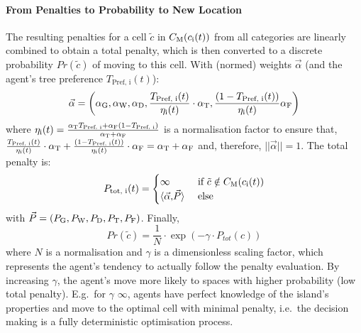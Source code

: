 \paragraph{From Penalties to Probability to New Location}
The resulting penalties for a cell $\tilde{c}$ in $C_{\rm M}(c_{\rm i}(t))$ from all categories are linearly combined to obtain a total penalty, which is then converted to a discrete probability $Pr(\tilde{c})$ of moving to this cell.
With (normed) weights $\vec{\alpha}$ (and the agent's tree preference $T_\text{Pref, i}(t)$):
\begin{equation}\label{eq:vecalpha}
\vec{\alpha} = \left(\alpha_{\rm G},  \alpha_{\rm W}, \alpha_{\rm D},  \frac{T_\text{Pref, i}(t)}{\eta_{\rm i}(t)} \cdot \alpha_{\rm T}, \frac{(1-T_\text{Pref, i}(t))}{\eta_{\rm i}(t)} \alpha_{\rm F}\right)
\end{equation} 
where $\eta_{\rm i}(t) = \frac{\alpha_{\rm T} T_\text{Pref, i}+ \alpha_{\rm F} (1-T_\text{Pref, i})}{\alpha_{\rm T}+\alpha_{\rm F}}$ is a normalisation factor to ensure that, $\frac{T_\text{Pref, i}(t)}{\eta_{\rm i}(t)}\cdot \alpha_{\rm T} + \frac{(1-T_\text{Pref, i}(t))}{\eta_{\rm i}(t)} \cdot \alpha_{\rm F} = \alpha_{\rm T}+ \alpha_{\rm F}$ and, therefore, $||\vec{\alpha}||=1$. 
The total penalty is:
\begin{equation}
P_\text{tot, i}(t) =  \begin{cases} \infty & \text{ if } \tilde{c}\notin C_{\rm M}(c_{\rm i}(t))\\
	 \langle \vec{\alpha}{, } \vec{P} \rangle &  \text{ else}
	 \end{cases}
\end{equation}
with $\vec{P} = (P_{\rm G}, P_{\rm W}, P_{\rm D}, P_{\rm T}, P_{\rm F})$.
Finally, 
\begin{equation}
	Pr(\tilde{c})  = \frac{1}{N} \cdot \exp \left( - \gamma \cdot P_{tot}(c) \right) 
\end{equation}
where $N$ is a normalisation and $\gamma$ is a dimensionless scaling factor, which represents the agent's tendency to actually follow the penalty evaluation. 
By increasing $\gamma$, the agent's move more likely to spaces with higher probability (low total penalty). 
E.g.\ for $\gamma$ \ra $\infty$, agents have perfect knowledge of the island's properties and move to the optimal cell with minimal penalty, i.e.\ the decision making is a fully deterministic optimisation process\footnotemark.
